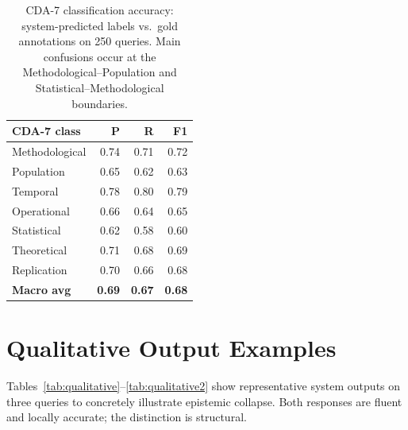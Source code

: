 \documentclass[11pt]{article}
\begin{document}
\begin{table}[!htbp]
\centering\small
\setlength{\tabcolsep}{4pt}
\begin{tabular}{@{}lrrr@{}}
\toprule
\textbf{CDA-7 class} & \textbf{P} & \textbf{R} & \textbf{F1} \\
\midrule
Methodological & 0.74 & 0.71 & 0.72 \\
Population     & 0.65 & 0.62 & 0.63 \\
Temporal       & 0.78 & 0.80 & 0.79 \\
Operational    & 0.66 & 0.64 & 0.65 \\
Statistical    & 0.62 & 0.58 & 0.60 \\
Theoretical    & 0.71 & 0.68 & 0.69 \\
Replication    & 0.70 & 0.66 & 0.68 \\
\midrule
\textbf{Macro avg} & \textbf{0.69} & \textbf{0.67} & \textbf{0.68} \\
\bottomrule
\end{tabular}
\caption{CDA-7 classification accuracy: system-predicted labels vs.\ gold
annotations on 250 queries.  Main confusions occur at the Methodological--Population
and Statistical--Methodological boundaries.}
\label{tab:cda7acc}
\end{table}

\section{Qualitative Output Examples}
\label{app:examples}

Tables~\ref{tab:qualitative}--\ref{tab:qualitative2} show representative
system outputs on three queries to concretely illustrate epistemic collapse.
Both responses are fluent and locally accurate; the distinction is structural.
\end{document}
